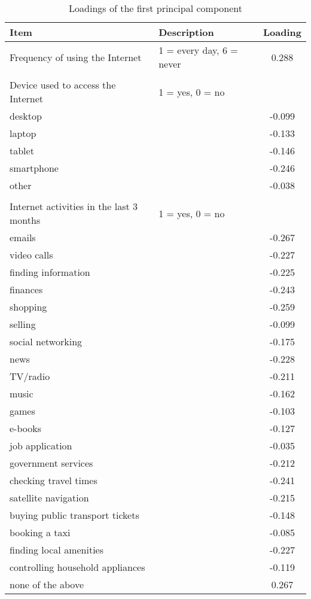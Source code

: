 \documentclass[12pt]{article}
\begin{document}
    \begin{table}[h!]
        \centering
        \caption{Loadings of the first principal component}
        \label{tab:pc1_loadings}
        \begin{tabular}{llc}
            \toprule
            Item & Description & Loading \\
            \midrule
            Frequency of using the Internet & 1 = every day, 6 = never & 0.288 \\
            & & \\
            Device used to access the Internet & 1 = yes, 0 = no & \\
            desktop & & -0.099 \\
            laptop & & -0.133 \\
            tablet & & -0.146 \\
            smartphone & & -0.246 \\
            other & & -0.038 \\
            & & \\
            Internet activities in the last 3 months & 1 = yes, 0 = no & \\
            emails & & -0.267 \\
            video calls & & -0.227 \\
            finding information & & -0.225 \\
            finances & & -0.243 \\
            shopping & & -0.259 \\
            selling & & -0.099 \\
            social networking & & -0.175 \\
            news & & -0.228 \\
            TV/radio & & -0.211 \\
            music & & -0.162 \\
            games & & -0.103 \\
            e-books & & -0.127 \\
            job application & & -0.035 \\
            government services & & -0.212 \\
            checking travel times & & -0.241 \\
            satellite navigation & & -0.215 \\
            buying public transport tickets & & -0.148 \\
            booking a taxi & & -0.085 \\
            finding local amenities & & -0.227 \\
            controlling household appliances & & -0.119 \\
            none of the above & & 0.267 \\
            \bottomrule
        \end{tabular}
    \end{table}
\end{document}
